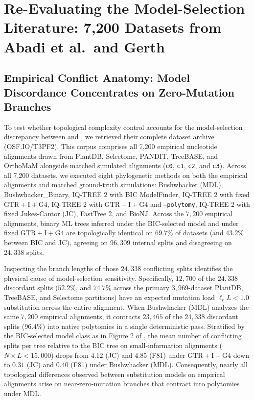 \documentclass[11pt,a4paper]{article}
\begin{document}
\section{Re-Evaluating the Model-Selection Literature: 7,200 Datasets from Abadi et al.\ and Gerth}

\subsection{Empirical Conflict Anatomy: Model Discordance Concentrates on Zero-Mutation Branches}

To test whether topological complexity control accounts for the model-selection discrepancy between \citet{abadi2019model} and \citet{gerth2019cannot}, we retrieved their complete dataset archive (OSF.IO/T3PF2). This corpus comprises all 7,200 empirical nucleotide alignments drawn from PlantDB, Selectome, PANDIT, TreeBASE, and OrthoMaM alongside matched simulated alignments (\texttt{c0}, \texttt{c1}, \texttt{c2}, and \texttt{c3}). Across all 7,200 datasets, we executed eight phylogenetic methods on both the empirical alignments and matched ground-truth simulations: Bushwhacker (MDL), Bushwhacker\_Binary, IQ-TREE 2 with BIC ModelFinder, IQ-TREE 2 with fixed $\text{GTR}+\text{I}+\text{G4}$, IQ-TREE 2 with $\text{GTR}+\text{I}+\text{G4}$ and \texttt{--polytomy}, IQ-TREE 2 with fixed Jukes-Cantor (JC), FastTree 2, and BioNJ. Across the $7,200$ empirical alignments, binary ML trees inferred under the BIC-selected model and under fixed $\text{GTR}+\text{I}+\text{G4}$ are topologically identical on $69.7\%$ of datasets (and $43.2\%$ between BIC and JC), agreeing on $96,309$ internal splits and disagreeing on $24,338$ splits.

Inspecting the branch lengths of those $24,338$ conflicting splits identifies the physical cause of model-selection sensitivity. Specifically, $12,700$ of the $24,338$ discordant splits ($52.2\%$, and $74.7\%$ across the primary $3,969$-dataset PlantDB, TreeBASE, and Selectome partitions) have an expected mutation load $\ell_e L < 1.0$ substitution across the entire alignment. When Bushwhacker (MDL) analyzes the same $7,200$ empirical alignments, it contracts $23,465$ of the $24,338$ discordant splits ($96.4\%$) into native polytomies in a single deterministic pass. Stratified by the BIC-selected model class as in Figure 2 of \citet{gerth2019cannot}, the mean number of conflicting splits per tree relative to the BIC tree on small-information alignments ($N \times L < 15,000$) drops from $4.12$ (JC) and $4.85$ (F81) under $\text{GTR}+\text{I}+\text{G4}$ down to $0.31$ (JC) and $0.40$ (F81) under Bushwhacker (MDL). Consequently, nearly all topological differences observed between substitution models on empirical alignments arise on near-zero-mutation branches that contract into polytomies under MDL.
\end{document}
